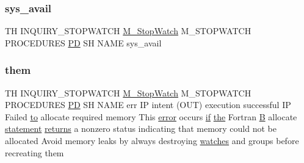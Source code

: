 \subsubsection{\texorpdfstring{sys\+\_\+avail}{sys\_avail}}
{\footnotesize\ttfamily TH I\+N\+Q\+U\+I\+R\+Y\+\_\+\+S\+T\+O\+P\+W\+A\+T\+CH \hyperlink{option__stopwatch_83_8txt_aa2011fc45a5e502e87ee50996a8a9305}{M\+\_\+\+Stop\+Watch} M\+\_\+\+S\+T\+O\+P\+W\+A\+T\+CH P\+R\+O\+C\+E\+D\+U\+R\+ES \hyperlink{what__overview_81_8txt_a85f26da5a4481fbdb0d9c79f2b94de3e}{PD} SH N\+A\+ME sys\+\_\+avail}

\mbox{\label{inquiry__stopwatch_83_8txt_aba56042309c21e69313821cb6c092c35}} 
\subsubsection{\texorpdfstring{them}{them}}
{\footnotesize\ttfamily TH I\+N\+Q\+U\+I\+R\+Y\+\_\+\+S\+T\+O\+P\+W\+A\+T\+CH \hyperlink{option__stopwatch_83_8txt_aa2011fc45a5e502e87ee50996a8a9305}{M\+\_\+\+Stop\+Watch} M\+\_\+\+S\+T\+O\+P\+W\+A\+T\+CH P\+R\+O\+C\+E\+D\+U\+R\+ES \hyperlink{what__overview_81_8txt_a85f26da5a4481fbdb0d9c79f2b94de3e}{PD} SH N\+A\+ME err IP intent (O\+UT) execution successful IP Failed \hyperlink{M__stopwatch_83_8txt_a97209fd3e34ef701c0a9734280779cbb}{to} allocate required memory This \hyperlink{M__stopwatch_83_8txt_ac4611edff506351be87ddb9adfc62315}{error} occurs \hyperlink{exit_87_8txt_a77395982f8d25581c808c40f3b634d90}{if} \hyperlink{M__stopwatch_83_8txt_a0f266597de2e57eb3aa964927bb30e14}{the} Fortran \hyperlink{intro__blas1_83_8txt_a5f157716d3fd55e7b7e08312dc859b58}{B} allocate \hyperlink{M__stopwatch_83_8txt_a43758526aa61bbaa49faf1e287658350}{statement} \hyperlink{M__stopwatch_83_8txt_aee54cdd5349bf498aa96e7f9426a0717}{returns} a nonzero status indicating that memory could not be allocated Avoid memory leaks by always destroying \hyperlink{M__stopwatch_83_8txt_a21c5980264dbe8d8a18083e2dd1ffaa9}{watches} and groups before recreating them}

\mbox{\label{inquiry__stopwatch_83_8txt_a302378a0fc3cc389357199927dccdc6d}} 
